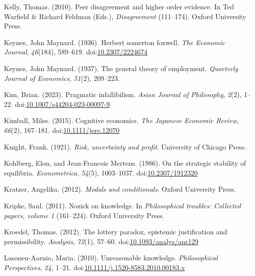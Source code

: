 \documentclass[
  12pt,
  letterpaper,
]{scrbook}
\newlength{\cslhangindent}
\newenvironment{CSLReferences}[2] %
 {\begin{list}{}{%
  \setlength{\itemindent}{0pt}
  \setlength{\leftmargin}{0pt}
  \setlength{\parsep}{0pt}
  \ifodd #1
   \setlength{\leftmargin}{\cslhangindent}
   \setlength{\itemindent}{-1\cslhangindent}
  \fi
  \setlength{\itemsep}{#2\baselineskip}}}
 {\end{list}}
\begin{document}
\begin{CSLReferences}{1}{0}
Kelly, Thomas. (2010). Peer disagreement and higher order evidence. In
Ted Warfield \& Richard Feldman (Eds.), \emph{Disagreement} (111--174).
Oxford University Press.

Keynes, John Maynard. (1936). Herbert somerton foxwell. \emph{The
Economic Journal}, \emph{46}(184), 589--619.
doi:\href{https://doi.org/10.2307/2224674}{10.2307/2224674}

Keynes, John Maynard. (1937). The general theory of employment.
\emph{Quarterly Journal of Economics}, \emph{51}(2), 209--223.

Kim, Brian. (2023). Pragmatic infallibilism. \emph{Asian Journal of
Philosophy}, \emph{2}(2), 1--22.
doi:\href{https://doi.org/10.1007/s44204-023-00097-9}{10.1007/s44204-023-00097-9}

Kimball, Miles. (2015). Cognitive economics. \emph{The Japanese Economic
Review}, \emph{66}(2), 167--181.
doi:\href{https://doi.org/10.1111/jere.12070}{10.1111/jere.12070}

Knight, Frank. (1921). \emph{Risk, uncertainty and profit}. University
of Chicago Press.

Kohlberg, Elon, and Jean-Francois Mertens. (1986). On the strategic
stability of equilibria. \emph{Econometrica}, \emph{54}(5), 1003--1037.
doi:\href{https://doi.org/10.2307/1912320}{10.2307/1912320}

Kratzer, Angelika. (2012). \emph{Modals and conditionals}. Oxford
University Press.

Kripke, Saul. (2011). Nozick on knowledge. In \emph{Philosophical
troubles: Collected papers, volume 1} (161--224). {O}xford {U}niversity
{P}ress.

Kroedel, Thomas. (2012). The lottery paradox, epistemic justification
and permissibility. \emph{Analysis}, \emph{72}(1), 57--60.
doi:\href{https://doi.org/10.1093/analys/anr129}{10.1093/analys/anr129}

Lasonen-Aarnio, Maria. (2010). Unreasonable knowledge.
\emph{Philosophical Perspectives}, \emph{24}, 1--21.
doi:\href{https://doi.org/10.1111/j.1520-8583.2010.00183.x}{10.1111/j.1520-8583.2010.00183.x}


\end{CSLReferences}
\end{document}
